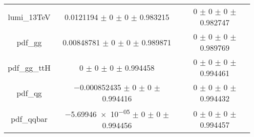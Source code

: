 \begin{table}
\begin{tabular}{ccc}
lumi\_13TeV & \num{0.0121194} $\pm$ \num{0} $\pm$ \num{0} $\pm$ \num{0.983215} & \num{0} $\pm$ \num{0} $\pm$ \num{0} $\pm$ \num{0.982747}\\
pdf\_gg & \num{0.00848781} $\pm$ \num{0} $\pm$ \num{0} $\pm$ \num{0.989871} & \num{0} $\pm$ \num{0} $\pm$ \num{0} $\pm$ \num{0.989769}\\
pdf\_gg\_ttH & \num{0} $\pm$ \num{0} $\pm$ \num{0} $\pm$ \num{0.994458} & \num{0} $\pm$ \num{0} $\pm$ \num{0} $\pm$ \num{0.994461}\\
pdf\_qg & \num{-0.000852435} $\pm$ \num{0} $\pm$ \num{0} $\pm$ \num{0.994416} & \num{0} $\pm$ \num{0} $\pm$ \num{0} $\pm$ \num{0.994432}\\
pdf\_qqbar & \num{-5.69946e-05} $\pm$ \num{0} $\pm$ \num{0} $\pm$ \num{0.994456} & \num{0} $\pm$ \num{0} $\pm$ \num{0} $\pm$ \num{0.994457}\\
\bottomrule
\end{tabular}
\end{table}